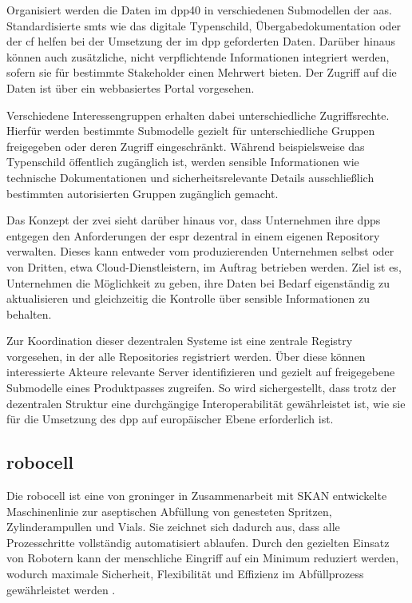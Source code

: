 \clearpage
Organisiert werden die Daten im \acs{dpp40} in verschiedenen Submodellen der \acs{aas}. 
Standardisierte \acsp{smt} wie das digitale Typenschild, Übergabedokumentation oder der \acs{cf} helfen bei der Umsetzung der im \acs{dpp} geforderten Daten.
Darüber hinaus können auch zusätzliche, nicht verpflichtende Informationen integriert werden, sofern sie für bestimmte 
\linebreak
Stakeholder einen Mehrwert bieten.
Der Zugriff auf die Daten ist über ein webbasiertes Portal vorgesehen. 

Verschiedene Interessengruppen erhalten dabei unterschiedliche Zugriffsrechte. 
Hierfür werden bestimmte Submodelle gezielt für unterschiedliche Gruppen freigegeben oder deren Zugriff eingeschränkt. 
Während beispielsweise das Typenschild öffentlich zugänglich ist, werden sensible Informationen wie technische Dokumentationen und sicherheitsrelevante Details ausschließlich bestimmten autorisierten Gruppen zugänglich gemacht.

Das Konzept der \acs{zvei} sieht darüber hinaus vor, dass Unternehmen ihre \acsp{dpp} entgegen den Anforderungen der \acs{espr} dezentral in einem eigenen Repository verwalten. 
Dieses kann entweder vom produzierenden Unternehmen selbst oder von Dritten, etwa Cloud-Dienstleistern, im Auftrag betrieben werden. 
Ziel ist es, Unternehmen die Möglichkeit zu geben, ihre Daten bei Bedarf eigenständig zu aktualisieren und gleichzeitig die Kontrolle über sensible Informationen zu behalten.

Zur Koordination dieser dezentralen Systeme ist eine zentrale Registry vorgesehen, in der alle Repositories registriert werden.
Über diese können interessierte Akteure relevante Server identifizieren und gezielt auf freigegebene Submodelle eines Produktpasses zugreifen.
So wird sichergestellt, dass trotz der dezentralen Struktur eine durchgängige Interoperabilität gewährleistet ist, wie sie für die Umsetzung des \acs{dpp} auf europäischer Ebene erforderlich ist.

\subsection{robocell}
Die robocell ist eine von groninger in Zusammenarbeit mit SKAN entwickelte Maschinenlinie zur aseptischen Abfüllung von genesteten Spritzen, Zylinderampullen und Vials.
Sie zeichnet sich dadurch aus, dass alle Prozesschritte vollständig automatisiert ablaufen.
Durch den gezielten Einsatz von Robotern kann der menschliche Eingriff auf ein Minimum reduziert werden, wodurch maximale Sicherheit, Flexibilität und Effizienz im Abfüllprozess gewährleistet werden \cite{RobocellWebsite}.

